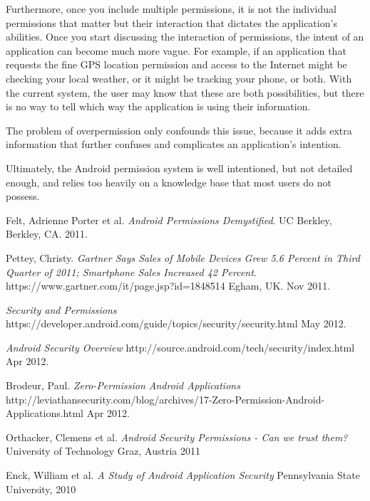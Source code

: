 \documentclass[12pt,pdftex]{article}
\begin{document}
\begin{doublespace}
Furthermore, once you include multiple permissions, it is not the individual permissions that matter but their interaction that dictates the application's abilities.  Once you start discussing the interaction of permissions, the intent of an application can become much more vague.  For example, if an application that requests the fine GPS location permission and access to the Internet might be checking your local weather, or it might be tracking your phone, or both.  With the current system, the user may know that these are both possibilities, but there is no way to tell which way the application is using their information.

The problem of overpermission only confounds this issue, because it adds extra information that further confuses and complicates an application's intention.

Ultimately, the Android permission system is well intentioned, but not detailed enough, and relies too heavily on a knowledge base that most users do not possess.

\end{doublespace}

\begin{thebibliography}{9}

  Felt, Adrienne Porter et al.
  \emph{Android Permissions Demystified}.
  UC Berkley, Berkley, CA.
  2011.

  Pettey, Christy.
  \emph{Gartner Says Sales of Mobile Devices Grew 5.6 Percent in Third Quarter of 2011; Smartphone Sales Increased 42 Percent}.
  https://www.gartner.com/it/page.jsp?id=1848514
  Egham, UK.
  Nov 2011.

  \emph{Security and Permissions}
  https://developer.android.com/guide/topics/security/security.html
  May 2012.

  \emph{Android Security Overview}
  http://source.android.com/tech/security/index.html
  Apr 2012.

  Brodeur, Paul.
  \emph{Zero-Permission Android Applications}
  http://leviathansecurity.com/blog/archives/17-Zero-Permission-Android-Applications.html
  Apr 2012.

  Orthacker, Clemens et al.
  \emph{Android Security Permissions - Can we trust them?}
  University of Technology Graz, Austria
  2011

  Enck, William et al.
  \emph{A Study of Android Application Security}
  Pennsylvania State University,
  2010

\end{thebibliography}
\end{document}
